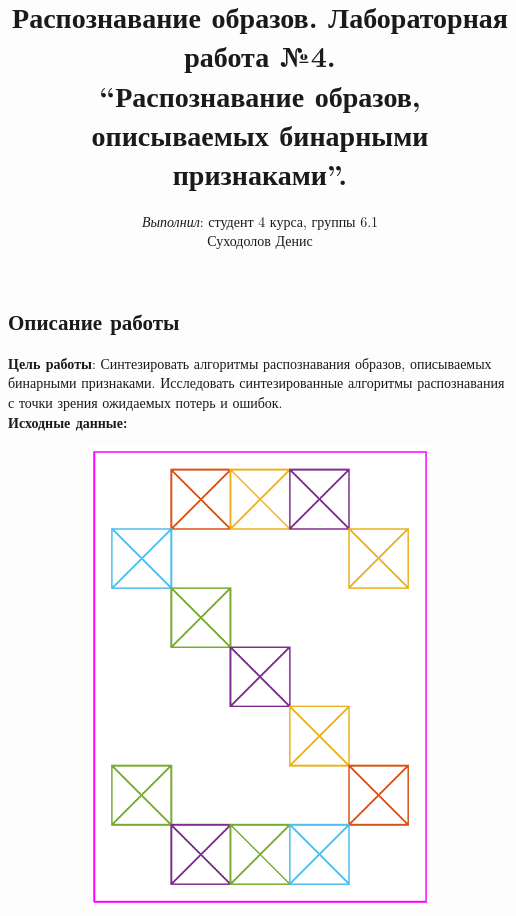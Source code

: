 \documentclass[10pt]{article} %
\begin{document}

\title{{\large Распознавание образов. Лабораторная работа №4.} \\
	\textbf{\textquotedblleft Распознавание образов, описываемых бинарными признаками\textquotedblright}.\\
	}
\date{}
\author{\textit{Выполнил}: студент 4 курса, группы 6.1 \\
	Суходолов Денис}
        
\maketitle

\begin{spacing}{1} %
\section*{Описание работы}
\textbf{Цель работы}: Синтезировать  алгоритмы  распознавания  образов,
описываемых  бинарными  признаками.  Исследовать  синтезированные
алгоритмы распознавания с точки зрения ожидаемых потерь и ошибок.
~\\
\textbf{Исходные данные:}
\begin{figure}[h]
	\centering
	\begin{subfigure}{.4\textwidth}
		\centering
		\includegraphics[width=.6\linewidth]{sphoto.eps}
	\end{subfigure}%
	\begin{subfigure}{.4\textwidth}

\end{subfigure}
\end{figure}
\end{spacing}
\end{document}

